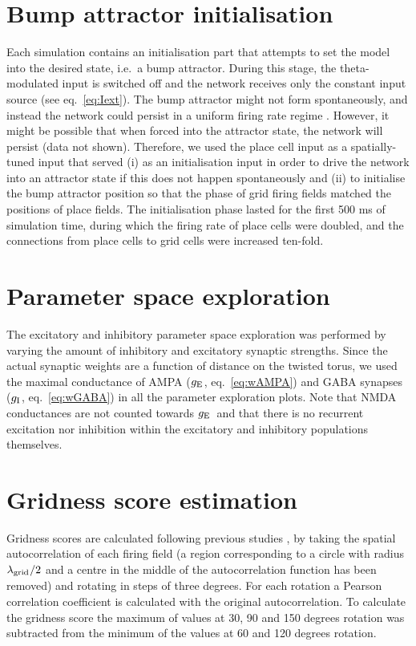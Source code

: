 \documentclass[a4paper,12pt]{article}
\newcommand{\ssc}[3]{\ensuremath{#1_{\text{#2}_{\text{#3}}}}}
\newcommand{\gE      }{\ssc{g}      {\scriptsize{E}}{}}
\newcommand{\gI      }{\ssc{g}      {\scriptsize{I}}{}}
\newcommand{\lamgrid}{\ssc{\lambda}{\scriptsize{grid}}{}}
\begin{document}
\section{Bump attractor initialisation} \label{sec:noise_bump_init_app}

Each simulation contains an initialisation part that attempts to set the model
into the desired state, i.e.\ a bump attractor. During this stage, the
theta-modulated input is switched off and the network receives only the
constant input source (see eq.~\ref{eq:Iext}). The bump attractor might not
form spontaneously, and instead the network could persist in a  uniform firing
rate regime \citep{Compte:2000ul}. However, it might be possible that when
forced into the attractor state, the network will persist (data not shown).
Therefore, we used the place cell input as a spatially-tuned input that served
(i) as an initialisation input in order to drive the network into an attractor
state if this does not happen spontaneously and (ii) to initialise the bump
attractor position so that the phase of grid firing fields matched the positions
of place fields. The initialisation phase lasted for the first 500 ms of
simulation time, during which the firing rate of place cells were doubled, and
the connections from place cells to grid cells were increased ten-fold.



\section{Parameter space exploration} \label{sec:param_sweeps}

The excitatory and inhibitory parameter space exploration was performed by
varying the amount of inhibitory and excitatory synaptic strengths. Since the
actual synaptic weights are a function of distance on the twisted torus, we
used the maximal conductance of AMPA ($\gE$, eq.~\ref{eq:wAMPA}) and GABA
synapses ($\gI$, eq.~\ref{eq:wGABA}) in all the parameter exploration plots.
Note that NMDA conductances are not counted towards $\gE$\ and that there is no
recurrent excitation nor inhibition within the excitatory and inhibitory
populations themselves.



\section{Gridness score estimation}

Gridness scores are calculated following previous studies
\citep{Sargolini:2006ba}, by taking the spatial autocorrelation of each firing
field (a region corresponding to a circle with radius $\lamgrid/2$ and a centre
in the middle of the autocorrelation function has been removed) and rotating in
steps of three degrees.  For each rotation a Pearson correlation coefficient is
calculated with the original autocorrelation. To calculate the gridness score
the maximum of values at 30, 90 and 150 degrees rotation was subtracted from
the minimum of the values at 60 and 120 degrees rotation.
\end{document}

